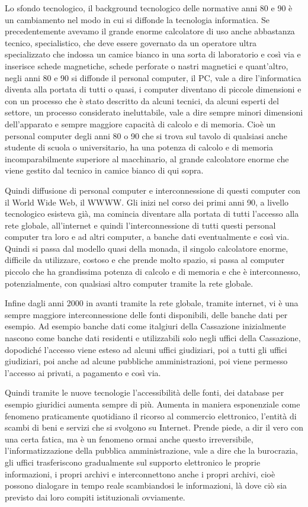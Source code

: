 Lo sfondo tecnologico, il background tecnologico delle normative anni 80 e 90 è un cambiamento nel modo in cui si diffonde la tecnologia informatica. Se precedentemente avevamo il grande enorme calcolatore di uso anche abbastanza tecnico, specialistico, che deve essere governato da un operatore ultra specializzato che indossa un camice bianco in una sorta di laboratorio e così via e inserisce schede magnetiche, schede perforate o nastri magnetici e quant'altro, negli anni 80 e 90 si diffonde il personal computer, il PC, vale a dire l'informatica diventa alla portata di tutti o quasi, i computer diventano di piccole dimensioni e con un processo che è stato descritto da alcuni tecnici, da alcuni esperti del settore, un processo considerato ineluttabile, vale a dire sempre minori dimensioni dell'apparato e sempre maggiore capacità di calcolo e di memoria. Cioè un personal computer degli anni 80 o 90 che si trova sul tavolo di qualsiasi anche studente di scuola o universitario, ha una potenza di calcolo e di memoria incomparabilmente superiore al macchinario, al grande calcolatore enorme che viene gestito dal tecnico in camice bianco di qui sopra. \par
Quindi diffusione di personal computer e interconnessione di questi computer con il World Wide Web, il WWWW. Gli inizi nel corso dei primi anni 90, a livello tecnologico esisteva già, ma comincia diventare alla portata di tutti l'accesso alla rete globale, all'internet e quindi l'interconnessione di tutti questi personal computer tra loro e ad altri computer, a banche dati eventualmente e così via. Quindi si passa dal modello quasi della monada, il singolo calcolatore enorme, difficile da utilizzare, costoso e che prende molto spazio, si passa al computer piccolo che ha grandissima potenza di calcolo e di memoria e che è interconnesso, potenzialmente, con qualsiasi altro computer tramite la rete globale.\par 
Infine dagli anni 2000 in avanti tramite la rete globale, tramite internet, vi è una sempre maggiore interconnessione delle fonti disponibili, delle banche dati per esempio. Ad esempio banche dati come italgiuri della Cassazione inizialmente nascono come banche dati residenti e utilizzabili solo negli uffici della Cassazione, dopodiché l'accesso viene esteso ad alcuni uffici giudiziari, poi a tutti gli uffici giudiziari, poi anche ad alcune pubbliche amministrazioni, poi viene permesso l'accesso ai privati, a pagamento e così via.\par 
Quindi tramite le nuove tecnologie l'accessibilità delle fonti, dei database per esempio giuridici aumenta sempre di più. Aumenta in maniera esponenziale come fenomeno praticamente quotidiano il ricorso al commercio elettronico, l'entità di scambi di beni e servizi che si svolgono su Internet. Prende piede, a dir il vero con una certa fatica, ma è un fenomeno ormai anche questo irreversibile, l'informatizzazione della pubblica amministrazione, vale a dire che la burocrazia, gli uffici trasferiscono gradualmente sul supporto elettronico le proprie informazioni, i propri archivi e interconnettono anche i propri archivi, cioè possono dialogare in tempo reale scambiandosi le informazioni, là dove ciò sia previsto dai loro compiti istituzionali ovviamente.\par 
